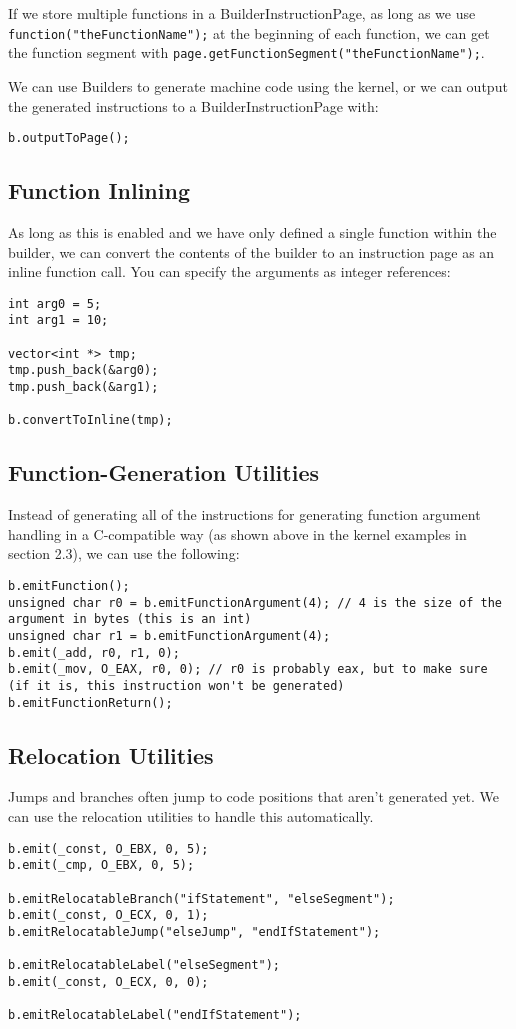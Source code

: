 \documentclass[10pt,a4paper]{article}
\begin{document}
If we store multiple functions in a BuilderInstructionPage, as long as we use \verb|function("theFunctionName");| at the beginning of each function, we can get the function segment with \verb|page.getFunctionSegment("theFunctionName");|.

We can use Builders to generate machine code using the kernel, or we can output the generated instructions to a BuilderInstructionPage with:
\begin{verbatim}
b.outputToPage();
\end{verbatim}

\subsection{Function Inlining}
As long as this is enabled and we have only defined a single function within the builder, we can convert the contents of the builder to an instruction page  as an inline function call. You can specify the arguments as integer references:
\begin{verbatim}
int arg0 = 5;
int arg1 = 10;

vector<int *> tmp;
tmp.push_back(&arg0);
tmp.push_back(&arg1);

b.convertToInline(tmp);
\end{verbatim}

\subsection{Function-Generation Utilities}
Instead of generating all of the instructions for generating function argument handling in a C-compatible way (as shown above in the kernel examples in section 2.3), we can use the following:
\begin{verbatim}
b.emitFunction();
unsigned char r0 = b.emitFunctionArgument(4); // 4 is the size of the argument in bytes (this is an int)
unsigned char r1 = b.emitFunctionArgument(4);
b.emit(_add, r0, r1, 0);
b.emit(_mov, O_EAX, r0, 0); // r0 is probably eax, but to make sure (if it is, this instruction won't be generated)
b.emitFunctionReturn();
\end{verbatim}

\subsection{Relocation Utilities}
Jumps and branches often jump to code positions that aren't generated yet. We can use the relocation utilities to handle this automatically.
\begin{verbatim}
b.emit(_const, O_EBX, 0, 5);
b.emit(_cmp, O_EBX, 0, 5);

b.emitRelocatableBranch("ifStatement", "elseSegment");
b.emit(_const, O_ECX, 0, 1);
b.emitRelocatableJump("elseJump", "endIfStatement");

b.emitRelocatableLabel("elseSegment");
b.emit(_const, O_ECX, 0, 0);

b.emitRelocatableLabel("endIfStatement");
\end{verbatim}
\end{document}
